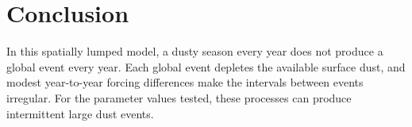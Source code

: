 \section{Conclusion}
\label{sec:conclusion}

In this spatially lumped model, a dusty season every year does not produce a global event every year. Each global event depletes the available surface dust, and modest year-to-year forcing differences make the intervals between events irregular. For the parameter values tested, these processes can produce intermittent large dust events.
